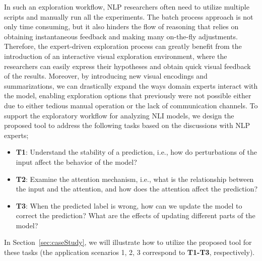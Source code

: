 In such an exploration workflow, NLP researchers often need to utilize multiple scripts and manually run all the experiments. The batch process approach is not only time consuming, but it also hinders the flow of reasoning that relies on obtaining instantaneous feedback and making many on-the-fly adjustments.
%
Therefore, the expert-driven exploration process can greatly benefit from the introduction of an interactive visual exploration environment, where the researchers can easily express their hypotheses and obtain quick visual feedback of the results.
%
Moreover, by introducing new visual encodings and summarizations, we can drastically expand the ways domain experts interact with the model, enabling exploration options that previously were not possible either due to either tedious manual operation or the lack of communication channels.
%
To support the exploratory workflow for analyzing NLI models,
we design the proposed tool to address the following tasks based on the discussions with NLP experts;

\vspace {-2mm}
\begin{itemize}
\item \textbf{T1}: Understand the stability of a prediction, i.e., how do perturbations of the input affect the behavior of the model?
    
\item \textbf{T2}: Examine the attention mechanism, i.e., what is the relationship between the input and the attention, and how does the attention affect the prediction?
    
\item \textbf{T3}: When the predicted label is wrong, how can we update the model to correct the prediction? What are the effects of updating different parts of the model?
\end{itemize}
\vspace {-2mm}

In Section~\ref{sec:caseStudy}, we will illustrate how to utilize the proposed tool for these tasks (the application scenarios 1, 2, 3 correspond to \textbf{T1-T3}, respectively).



